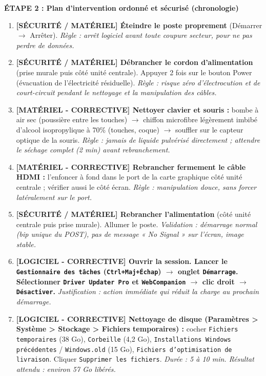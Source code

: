\documentclass[11pt]{article}
\begin{document}
\begin{exoresolu}
\textbf{ÉTAPE 2 : Plan d'intervention ordonné et sécurisé (chronologie)}

\begin{enumerate}
    \item \textbf{[SÉCURITÉ / MATÉRIEL] Éteindre le poste proprement} (Démarrer $\rightarrow$ Arrêter). \textit{Règle : arrêt logiciel avant toute coupure secteur, pour ne pas perdre de données.}
    \item \textbf{[SÉCURITÉ / MATÉRIEL] Débrancher le cordon d'alimentation} (prise murale puis côté unité centrale). Appuyer 2 fois sur le bouton Power (évacuation de l'électricité résiduelle). \textit{Règle : risque zéro d'électrocution et de court-circuit pendant le nettoyage et la manipulation des câbles.}
    \item \textbf{[MATÉRIEL - CORRECTIVE] Nettoyer clavier et souris :} bombe à air sec (poussière entre les touches) $\rightarrow$ chiffon microfibre légèrement imbibé d'alcool isopropylique à 70\% (touches, coque) $\rightarrow$ souffler sur le capteur optique de la souris. \textit{Règle : jamais de liquide pulvérisé directement ; attendre le séchage complet (2 min) avant rebranchement.}
    \item \textbf{[MATÉRIEL - CORRECTIVE] Rebrancher fermement le câble HDMI :} l'enfoncer à fond dans le port de la carte graphique côté unité centrale ; vérifier aussi le côté écran. \textit{Règle : manipulation douce, sans forcer latéralement sur le port.}
    \item \textbf{[SÉCURITÉ / MATÉRIEL] Rebrancher l'alimentation} (côté unité centrale puis prise murale). Allumer le poste. \textit{Validation : démarrage normal (bip unique du POST), pas de message « No Signal » sur l'écran, image stable.}
    \item \textbf{[LOGICIEL - CORRECTIVE] Ouvrir la session. Lancer le \texttt{Gestionnaire des tâches} (\texttt{Ctrl+Maj+Échap}) $\rightarrow$ onglet \texttt{Démarrage}. Sélectionner \texttt{Driver Updater Pro} et \texttt{WebCompanion} $\rightarrow$ clic droit $\rightarrow$ \texttt{Désactiver}.} \textit{Justification : action immédiate qui réduit la charge au prochain démarrage.}
    \item \textbf{[LOGICIEL - CORRECTIVE] Nettoyage de disque (Paramètres > Système > Stockage > Fichiers temporaires) :} cocher \texttt{Fichiers temporaires} (38 Go), \texttt{Corbeille} (4,2 Go), \texttt{Installations Windows précédentes} / \texttt{Windows.old} (15 Go), \texttt{Fichiers d'optimisation de livraison}. Cliquer \texttt{Supprimer les fichiers}. \textit{Durée : 5 à 10 min. Résultat attendu : environ 57 Go libérés.}

\end{enumerate}
\end{exoresolu}
\end{document}
